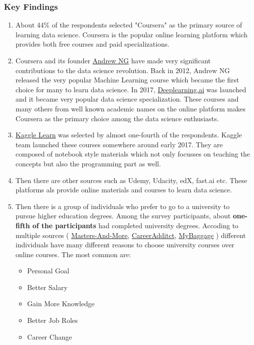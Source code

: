 \subsubsection{Key Findings}
\begin{enumerate}
    \item About 44\% of the respondents selected "Coursera" as the primary source of learning data science. Coursera is the popular online learning platform which provides both free courses and paid specializations.
    \item Coursera and its founder \href{https://en.wikipedia.org/wiki/Andrew_Ng}{Andrew NG} have made very significant contributions to the data science revolution. Back in 2012, Andrew NG released the very popular Machine Learning course which became the first choice for many to learn data science. In 2017, \href{https://www.deeplearning.ai/}{Deeplearning.ai} was launched and it became very popular data science specialization. These courses and many others from well known academic names on the online platform makes Coursera as the primary choice among the data science enthusiasts.
    \item \href{https://www.kaggle.com/learn}{Kaggle Learn} was selected by almost one-fourth of the respondents. Kaggle team launched these courses somewhere around early 2017. They are composed of notebook style materials which not only focusses on teaching the concepts but also the programming part as well.
    \item Then there are other sources such as Udemy, Udacity, edX, fast.ai etc. These platforms als provide online materials and courses to learn data science.
    \item Then there is a group of individuals who prefer to go to a university to pursue higher education degrees. Among the survey participants, about \textbf{one-fifth of the participants} had completed university degrees. Accoding to multiple sources ( \href{https://www.master-and-more.eu/en/7-reasons-why-you-should-choose-a-masters-degree/}{Masters-And-More}, \href{https://www.careeraddict.com/masters-degree-benefits}{CareerAdditct}, \href{https://www.mybaggage.com/blog/why-do-a-masters-degree-the-pros-and-cons/}{MyBaggage} ) different individuals have many different reasons to choose university courses over online courses. The most common are:
    \begin{itemize}
        \item Personal Goal
        \item Better Salary
        \item Gain More Knowledge
        \item Better Job Roles
        \item Career Change
    \end{itemize}
\end{enumerate}

